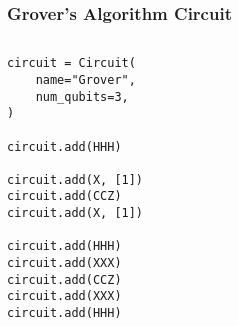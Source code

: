 \documentclass{beamer}
\newcommand{\verbatimsize}{\footnotesize}
\begin{document}
\begin{frame}[fragile]
    \frametitle{Grover's Algorithm Circuit}
    \begin{columns}
        \begin{column}{0.3\textwidth}
            \verbatimsize
\begin{verbatim}
circuit = Circuit(
    name="Grover",
    num_qubits=3,
)

circuit.add(HHH)

circuit.add(X, [1])
circuit.add(CCZ)
circuit.add(X, [1])

circuit.add(HHH)
circuit.add(XXX)
circuit.add(CCZ)
circuit.add(XXX)
circuit.add(HHH)
\end{verbatim}
        \end{column}
        \begin{column}{0.5\textwidth}
            \begin{center}
            \end{center}
        \end{column}
    \end{columns}
\end{frame}
\end{document}
